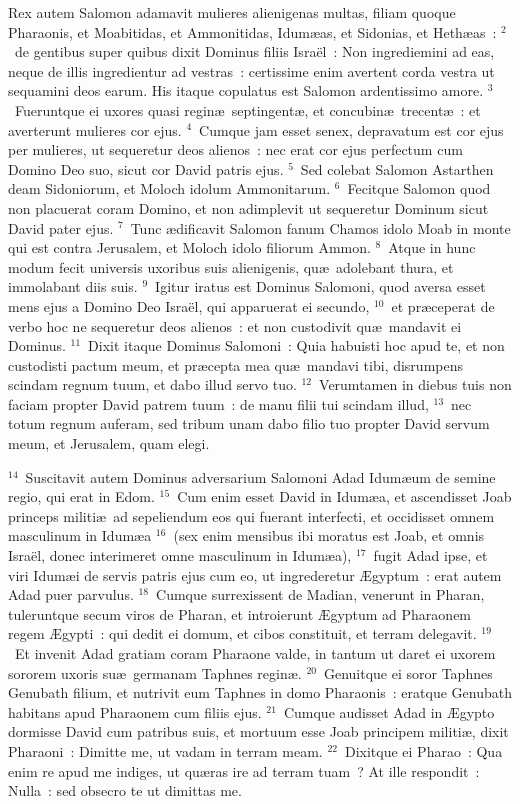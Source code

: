 \lettrine[lines=10,image=true,loversize=0.05,lraise=-0.03]{R}{}ex autem Salomon adamavit mulieres alienigenas multas, filiam quoque Pharaonis, et Moabitidas, et Ammonitidas, Idum\ae as, et Sidonias, et Heth\ae as~:
${}^{2}$~de gentibus super quibus dixit Dominus filiis Isra\"el~: Non ingrediemini ad eas, neque de illis ingredientur ad vestras~: certissime enim avertent corda vestra ut sequamini deos earum. His itaque copulatus est Salomon ardentissimo amore.
${}^{3}$~Fueruntque ei uxores quasi regin\ae\ septingent\ae , et concubin\ae\ trecent\ae~: et averterunt mulieres cor ejus.
${}^{4}$~Cumque jam esset senex, depravatum est cor ejus per mulieres, ut sequeretur deos alienos~: nec erat cor ejus perfectum cum Domino Deo suo, sicut cor David patris ejus.
${}^{5}$~Sed colebat Salomon Astarthen deam Sidoniorum, et Moloch idolum Ammonitarum.
${}^{6}$~Fecitque Salomon quod non placuerat coram Domino, et non adimplevit ut sequeretur Dominum sicut David pater ejus.
${}^{7}$~Tunc \ae dificavit Salomon fanum Chamos idolo Moab in monte qui est contra Jerusalem, et Moloch idolo filiorum Ammon.
${}^{8}$~Atque in hunc modum fecit universis uxoribus suis alienigenis, qu\ae\ adolebant thura, et immolabant diis suis.
${}^{9}$~Igitur iratus est Dominus Salomoni, quod aversa esset mens ejus a Domino Deo Isra\"el, qui apparuerat ei secundo,
${}^{10}$~et pr\ae ceperat de verbo hoc ne sequeretur deos alienos~: et non custodivit qu\ae\ mandavit ei Dominus.
${}^{11}$~Dixit itaque Dominus Salomoni~: Quia habuisti hoc apud te, et non custodisti pactum meum, et pr\ae cepta mea qu\ae\ mandavi tibi, disrumpens scindam regnum tuum, et dabo illud servo tuo.
${}^{12}$~Verumtamen in diebus tuis non faciam propter David patrem tuum~: de manu filii tui scindam illud,
${}^{13}$~nec totum regnum auferam, sed tribum unam dabo filio tuo propter David servum meum, et Jerusalem, quam elegi.


${}^{14}$~Suscitavit autem Dominus adversarium Salomoni Adad Idum\ae um de semine regio, qui erat in Edom.
${}^{15}$~Cum enim esset David in Idum\ae a, et ascendisset Joab princeps militi\ae\ ad sepeliendum eos qui fuerant interfecti, et occidisset omnem masculinum in Idum\ae a
${}^{16}$~(sex enim mensibus ibi moratus est Joab, et omnis Isra\"el, donec interimeret omne masculinum in Idum\ae a),
${}^{17}$~fugit Adad ipse, et viri Idum\ae i de servis patris ejus cum eo, ut ingrederetur \AE gyptum~: erat autem Adad puer parvulus.
${}^{18}$~Cumque surrexissent de Madian, venerunt in Pharan, tuleruntque secum viros de Pharan, et introierunt \AE gyptum ad Pharaonem regem \AE gypti~: qui dedit ei domum, et cibos constituit, et terram delegavit.
${}^{19}$~Et invenit Adad gratiam coram Pharaone valde, in tantum ut daret ei uxorem sororem uxoris su\ae\ germanam Taphnes regin\ae .
${}^{20}$~Genuitque ei soror Taphnes Genubath filium, et nutrivit eum Taphnes in domo Pharaonis~: eratque Genubath habitans apud Pharaonem cum filiis ejus.
${}^{21}$~Cumque audisset Adad in \AE gypto dormisse David cum patribus suis, et mortuum esse Joab principem militi\ae , dixit Pharaoni~: Dimitte me, ut vadam in terram meam.
${}^{22}$~Dixitque ei Pharao~: Qua enim re apud me indiges, ut qu\ae ras ire ad terram tuam~? At ille respondit~: Nulla~: sed obsecro te ut dimittas me.


